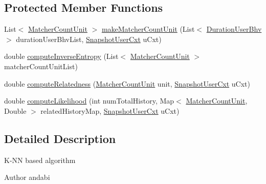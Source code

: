 \subsection*{\-Protected \-Member \-Functions}
\begin{DoxyCompactItemize}
\item 
\-List$<$ \hyperlink{classlab_1_1davidahn_1_1appshuttle_1_1predict_1_1matcher_1_1_matcher_count_unit}{\-Matcher\-Count\-Unit} $>$ \hyperlink{classlab_1_1davidahn_1_1appshuttle_1_1predict_1_1matcher_1_1position_1_1_location_position_matcher_a50ff6822bc7ee25e8006a56f7a3afb9d}{make\-Matcher\-Count\-Unit} (\-List$<$ \hyperlink{classlab_1_1davidahn_1_1appshuttle_1_1collect_1_1bhv_1_1_duration_user_bhv}{\-Duration\-User\-Bhv} $>$ duration\-User\-Bhv\-List, \hyperlink{classlab_1_1davidahn_1_1appshuttle_1_1collect_1_1_snapshot_user_cxt}{\-Snapshot\-User\-Cxt} u\-Cxt)
\item 
double \hyperlink{classlab_1_1davidahn_1_1appshuttle_1_1predict_1_1matcher_1_1position_1_1_location_position_matcher_a2f6619a2c7615ebf42eda3e2d5988271}{compute\-Inverse\-Entropy} (\-List$<$ \hyperlink{classlab_1_1davidahn_1_1appshuttle_1_1predict_1_1matcher_1_1_matcher_count_unit}{\-Matcher\-Count\-Unit} $>$ matcher\-Count\-Unit\-List)
\item 
double \hyperlink{classlab_1_1davidahn_1_1appshuttle_1_1predict_1_1matcher_1_1position_1_1_location_position_matcher_ac89bdfd35db4b835f73df8b78d986ee1}{compute\-Relatedness} (\hyperlink{classlab_1_1davidahn_1_1appshuttle_1_1predict_1_1matcher_1_1_matcher_count_unit}{\-Matcher\-Count\-Unit} unit, \hyperlink{classlab_1_1davidahn_1_1appshuttle_1_1collect_1_1_snapshot_user_cxt}{\-Snapshot\-User\-Cxt} u\-Cxt)
\item 
double \hyperlink{classlab_1_1davidahn_1_1appshuttle_1_1predict_1_1matcher_1_1position_1_1_location_position_matcher_a787f09d4907e0f44e926f77713426110}{compute\-Likelihood} (int num\-Total\-History, \-Map$<$ \hyperlink{classlab_1_1davidahn_1_1appshuttle_1_1predict_1_1matcher_1_1_matcher_count_unit}{\-Matcher\-Count\-Unit}, \-Double $>$ related\-History\-Map, \hyperlink{classlab_1_1davidahn_1_1appshuttle_1_1collect_1_1_snapshot_user_cxt}{\-Snapshot\-User\-Cxt} u\-Cxt)
\end{DoxyCompactItemize}


\subsection{\-Detailed \-Description}
\-K-\/\-N\-N based algorithm \begin{DoxyAuthor}{\-Author}
andabi 
\end{DoxyAuthor}


